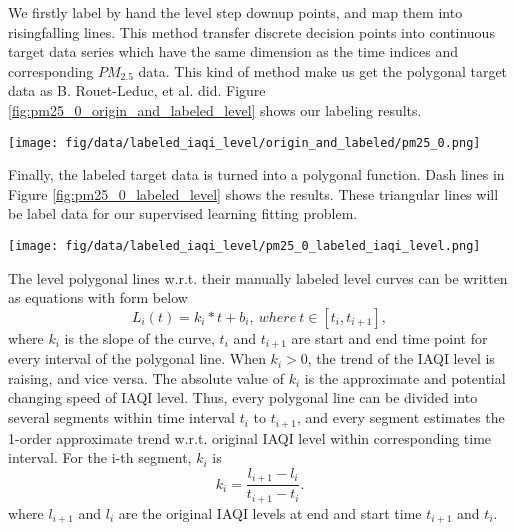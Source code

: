 \documentclass[
twocolumn,
]{ceurart}
\begin{document}
We firstly label by hand the level step down\/up points, and map them into rising\/falling lines. This method transfer discrete decision points into continuous target data series which have the same dimension as the time indices and corresponding $PM_{2.5}$ data. This kind of method make us get the polygonal target data as B. Rouet-Leduc, et al. \cite{rouet2017machine} did. Figure \ref{fig:pm25_0_origin_and_labeled_level} shows our labeling results.

\begin{figure*}[!htbp]
    \begin{center}
        \texttt{[image: fig/data/labeled\_iaqi\_level/origin\_and\_labeled/pm25\_0.png]}
        \caption{Sensor 0's $PM_{2.5}$ origin and labeled IAQI level.}
        \label{fig:pm25_0_origin_and_labeled_level}
    \end{center}
\end{figure*}


Finally, the labeled target data is turned into a polygonal function. Dash lines in Figure \ref{fig:pm25_0_labeled_level} shows the results. These triangular lines will be label data for our supervised learning fitting problem.

\begin{figure*}[!htbp]
    \centering
    \texttt{[image: fig/data/labeled\_iaqi\_level/pm25\_0\_labeled\_iaqi\_level.png]}
    \caption{Sensor 0's labeled $PM_{2.5}$ IAQI level and its polygonal line.}
    \label{fig:pm25_0_labeled_level}
\end{figure*}

The level polygonal lines w.r.t. their manually labeled level curves can be written as equations with form below
\begin{equation}
    \label{formula:polygonal}
    L_i(t)=k_i*t+b_i,\ where\ t\in[t_i,t_{i+1}],
\end{equation}
where $k_i$ is the slope of the curve, $t_i$ and $t_{i+1}$ are start and end time point for every interval of the polygonal line. When $k_i>0$, the trend of the IAQI level is raising, and vice versa. The absolute value of $k_i$ is the approximate and potential changing speed of IAQI level. Thus, every polygonal line can be divided into several segments within time interval $t_i$ to $t_{i+1}$, and every segment estimates the 1-order approximate trend w.r.t. original IAQI level within corresponding time interval. For the i-th segment, $k_i$ is
\begin{equation}
    k_i = \frac{l_{i+1}-l_i}{t_{i+1}-t_i}.
\end{equation}
where $l_{i+1}$ and $l_i$ are the original IAQI levels at end and start time $t_{i+1}$ and $t_i$.
\end{document}
